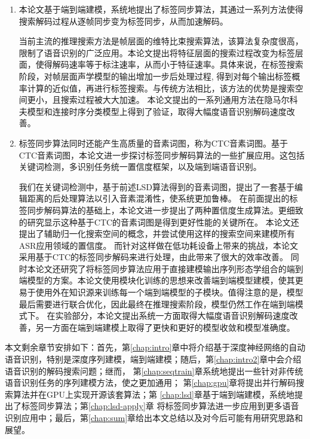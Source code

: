 \begin{enumerate}
\item 本论文基于端到端建模，系统地提出了标签同步算法，其通过一系列方法使得搜索解码过程从逐帧同步变为标签同步，从而加速解码。

当前主流的推理搜索方法是帧层面的维特比束搜索算法，该算法复杂度很高，限制了语音识别的广泛应用。本论文提出将特征层面的搜索过程改变为标签层面，使得解码速率等于标注速率，从而小于特征速率。具体来说，在标签搜索阶段，对帧层面声学模型的输出增加一步后处理过程, 得到对每个输出标签概率计算的近似值，再进行标签搜索。与传统方法相比，该方法的优势是搜索空间更小，且搜索过程被大大加速。
本论文提出的一系列通用方法在隐马尔科夫模型和连接时序分类模型上得到了验证，取得大幅度语音识别解码速度改善。

\item 标签同步算法同时还能产生高质量的音素词图，称为CTC音素词图。基于CTC音素词图，本论文进一步探讨标签同步解码算法的一些扩展应用。这包括关键词检测，多识别任务统一置信度框架，以及端到端语音识别。

我们在关键词检测中，基于前述LSD算法得到的音素词图，提出了一套基于编辑距离的后处理算法以引入音素混淆性，使系统更加鲁棒。
%
在前面提出的标签同步解码算法的基础上，本论文进一步提出了两种置信度生成算法。更细致的研究显示这种基于CTC的音素词图是得到更好性能的关键所在。
%
本论文还提出了辅助归一化搜索空间的概念，并尝试使用这样的搜索空间来建模所有ASR应用领域的置信度。 %
而针对这样做在低功耗设备上带来的挑战，本论文采用基于CTC的标签同步解码来进行处理，由此带来了很大的效率改善。
%
同时本论文还研究了将标签同步算法应用于直接建模输出序列形态学组合的端到端模型的方案。本论文使用模块化训练的思想来改善端到端模型建模，使其更易于使用外在知识源来训练每一个端到端模型的子模块。值得注意的是，模型最后需要进行联合优化，因此最终在推理搜索阶段，模型仍然工作在端到端模式下。
在实验部分，本论文提出系统一方面取得大幅度语音识别解码速度改善，另一方面在端到端建模上取得了更快和更好的模型收敛和模型准确度。

\end{enumerate}

本文剩余章节安排如下：首先，第\ref{chap:intro}章中将介绍基于深度神经网络的自动语音识别，特别是深度序列建模，端到端建模；随后，第\ref{chap:intro2}章中会介绍语音识别的解码搜索问题；继而，
第\ref{chap:seqtrain}章系统地提出一些针对非传统语音识别任务的序列建模方法，使之更加通用；
第\ref{chap:gpu}章将提出并行解码搜索算法并在GPU上实现开源该套算法；第
\ref{chap:lsd}章基于端到端建模，系统地提出了标签同步算法；第\ref{chap:lsd-apply}章
将标签同步算法进一步应用到更多语音识别应用中；最后，第\ref{chap:sum}章给出本文总结以及对今后可能有用研究思路和展望。
